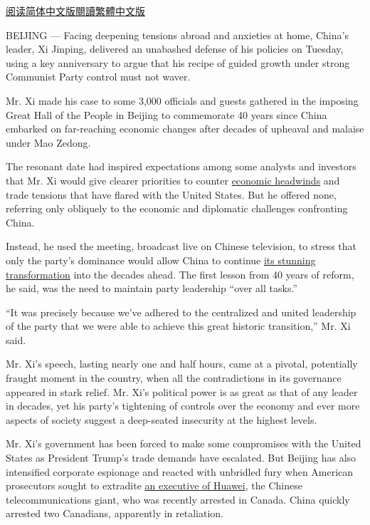 \href{https://cn.nytimes.com/china/20181219/xi-jinping-speech-china/}{阅读简体中文版}\href{https://cn.nytimes.com/china/20181219/xi-jinping-speech-china/zh-hant/}{閱讀繁體中文版}

BEIJING --- Facing deepening tensions abroad and anxieties at home,
China's leader, Xi Jinping, delivered an unabashed defense of his
policies on Tuesday, using a key anniversary to argue that his recipe of
guided growth under strong Communist Party control must not waver.

Mr. Xi made his case to some 3,000 officials and guests gathered in the
imposing Great Hall of the People in Beijing to commemorate 40 years
since China embarked on far-reaching economic changes after decades of
upheaval and malaise under Mao Zedong.

The resonant date had inspired expectations among some analysts and
investors that Mr. Xi would give clearer priorities to counter
\href{https://www.nytimes.com/2018/12/14/business/china-economy-xi-jinping.html?action=click\&module=RelatedCoverage\&pgtype=Article\&region=Footer}{economic
headwinds} and trade tensions that have flared with the United States.
But he offered none, referring only obliquely to the economic and
diplomatic challenges confronting China.

Instead, he used the meeting, broadcast live on Chinese television, to
stress that only the party's dominance would allow China to continue
\href{https://www.nytimes.com/interactive/2018/11/25/world/asia/china-economy-strategy.html?action=click\&module=RelatedCoverage\&pgtype=Article\&region=Footer}{its
stunning transformation} into the decades ahead. The first lesson from
40 years of reform, he said, was the need to maintain party leadership
``over all tasks.''

``It was precisely because we've adhered to the centralized and united
leadership of the party that we were able to achieve this great historic
transition,'' Mr. Xi said.

Mr. Xi's speech, lasting nearly one and half hours, came at a pivotal,
potentially fraught moment in the country, when all the contradictions
in its governance appeared in stark relief. Mr. Xi's political power is
as great as that of any leader in decades, yet his party's tightening of
controls over the economy and ever more aspects of society suggest a
deep-seated insecurity at the highest levels.

Mr. Xi's government has been forced to make some compromises with the
United States as President Trump's trade demands have escalated. But
Beijing has also intensified corporate espionage and reacted with
unbridled fury when American prosecutors sought to extradite
\href{https://www.nytimes.com/2018/12/14/business/huawei-meng-hsbc-canada.html?module=inline}{an
executive of Huawei}, the Chinese telecommunications giant, who was
recently arrested in Canada. China quickly arrested two Canadians,
apparently in retaliation.

